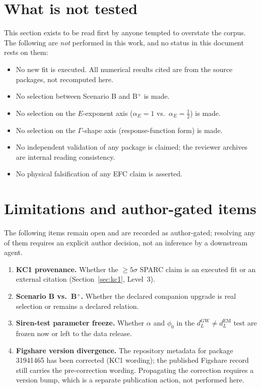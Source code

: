 \documentclass[11pt,a4paper]{article}
\begin{document}
\section{What is not tested}

This section exists to be read first by anyone tempted to overstate the corpus. The following are \emph{not} performed in this work, and no status in this document rests on them:

\begin{itemize}
\item No new fit is executed. All numerical results cited are from the source packages, not recomputed here.
\item No selection between Scenario B and B$^{+}$ is made.
\item No selection on the $E$-exponent axis ($\alpha_{E} = 1$ vs.\ $\alpha_{E} = \tfrac{1}{2}$) is made.
\item No selection on the $\Gamma$-shape axis (response-function form) is made.
\item No independent validation of any package is claimed; the reviewer archives are internal reading consistency.
\item No physical falsification of any EFC claim is asserted.
\end{itemize}

\section{Limitations and author-gated items}

The following items remain open and are recorded as author-gated; resolving any of them requires an explicit author decision, not an inference by a downstream agent.

\begin{enumerate}
\item \textbf{KC1 provenance.} Whether the $\ge 5\sigma$ SPARC claim is an executed fit or an external citation (Section~\ref{sec:kc1}, Level~3).
\item \textbf{Scenario B vs.\ B$^{+}$.} Whether the declared companion upgrade is real selection or remains a declared relation.
\item \textbf{Siren-test parameter freeze.} Whether $\alpha$ and $\phi_{0}$ in the $d_{L}^{\mathrm{GW}} \neq d_{L}^{\mathrm{EM}}$ test are frozen now or left to the data release.
\item \textbf{Figshare version divergence.} The repository metadata for package 31941465 has been corrected (KC1 wording); the published Figshare record still carries the pre-correction wording. Propagating the correction requires a version bump, which is a separate publication action, not performed here.
\end{enumerate}
\end{document}
